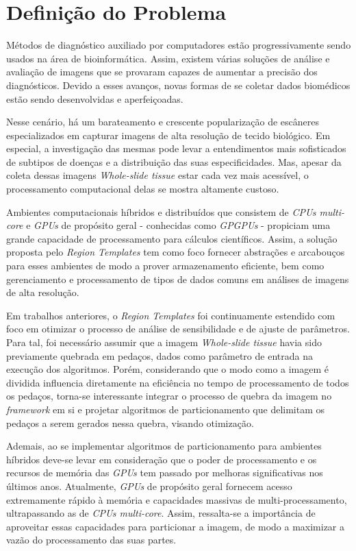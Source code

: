 \section{Definição do Problema}

Métodos de diagnóstico auxiliado por computadores estão progressivamente sendo usados na área de bioinformática. Assim, existem várias soluções de análise e avaliação de imagens que se provaram capazes de aumentar a precisão dos diagnósticos. Devido a esses avanços, novas formas de se coletar dados biomédicos estão sendo desenvolvidas e aperfeiçoadas. 

Nesse cenário, há um barateamento e crescente popularização de escâneres especializados em capturar imagens de alta resolução de tecido biológico. Em especial, a investigação das mesmas pode levar a entendimentos mais sofisticados de subtipos de doenças e a distribuição das suas especificidades\cite{sertel_kong_shimada_catalyurek_saltz_gurcan_2008}. Mas, apesar da coleta dessas imagens \textit{Whole-slide tissue} estar cada vez mais acessível, o processamento computacional delas se mostra altamente custoso.

Ambientes computacionais híbridos e distribuídos que consistem de \textit{CPUs multi-core} e \textit{GPUs} de propósito geral - conhecidas como \textit{GPGPUs} - propiciam uma grande capacidade de processamento para cálculos científicos. Assim, a solução proposta pelo \textit{Region Templates}\cite{TEODORO2014589} tem como foco fornecer abstrações e arcabouços para esses ambientes de modo a prover armazenamento eficiente, bem como gerenciamento e processamento de tipos de dados comuns em análises de imagens de alta resolução.

Em trabalhos anteriores, o \textit{Region Templates} foi continuamente estendido com foco em otimizar o processo de análise de sensibilidade e de ajuste de parâmetros\cite{doi:10.1093/bioinformatics/btw749}. Para tal, foi necessário assumir que a imagem \textit{Whole-slide tissue} havia sido previamente quebrada em pedaços, dados como parâmetro de entrada na execução dos algoritmos. Porém, considerando que o modo como a imagem é dividida influencia diretamente na eficiência no tempo de processamento de todos os pedaços, torna-se interessante integrar o processo de quebra da imagem no \textit{framework} em si e projetar algoritmos de particionamento que delimitam os pedaços a serem gerados nessa quebra, visando otimização.

Ademais, ao se implementar algoritmos de particionamento para ambientes híbridos deve-se levar em consideração que o poder de processamento e os recursos de memória das \textit{GPUs} tem passado por melhoras significativas nos últimos anos. Atualmente, \textit{GPUs} de propósito geral fornecem acesso extremamente rápido à memória e capacidades massivas de multi-processamento, ultrapassando as de \textit{CPUs multi-core}\cite{teodoro_pan_kurc_kong_cooper_podhorszki_klasky_saltz_2013}. Assim, ressalta-se a importância de aproveitar essas capacidades para particionar a imagem, de modo a maximizar a vazão do processamento das suas partes.

